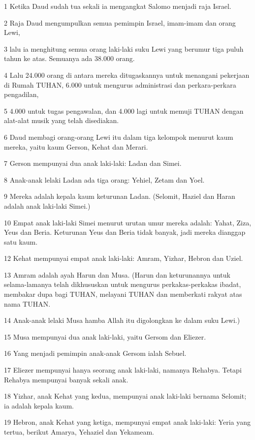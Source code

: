 \par 1 Ketika Daud sudah tua sekali ia mengangkat Salomo menjadi raja Israel.
\par 2 Raja Daud mengumpulkan semua pemimpin Israel, imam-imam dan orang Lewi,
\par 3 lalu ia menghitung semua orang laki-laki suku Lewi yang berumur tiga puluh tahun ke atas. Semuanya ada 38.000 orang.
\par 4 Lalu 24.000 orang di antara mereka ditugaskannya untuk menangani pekerjaan di Rumah TUHAN, 6.000 untuk mengurus administrasi dan perkara-perkara pengadilan,
\par 5 4.000 untuk tugas pengawalan, dan 4.000 lagi untuk memuji TUHAN dengan alat-alat musik yang telah disediakan.
\par 6 Daud membagi orang-orang Lewi itu dalam tiga kelompok menurut kaum mereka, yaitu kaum Gerson, Kehat dan Merari.
\par 7 Gerson mempunyai dua anak laki-laki: Ladan dan Simei.
\par 8 Anak-anak lelaki Ladan ada tiga orang: Yehiel, Zetam dan Yoel.
\par 9 Mereka adalah kepala kaum keturunan Ladan. (Selomit, Haziel dan Haran adalah anak laki-laki Simei.)
\par 10 Empat anak laki-laki Simei menurut urutan umur mereka adalah: Yahat, Ziza, Yeus dan Beria. Keturunan Yeus dan Beria tidak banyak, jadi mereka dianggap satu kaum.
\par 12 Kehat mempunyai empat anak laki-laki: Amram, Yizhar, Hebron dan Uziel.
\par 13 Amram adalah ayah Harun dan Musa. (Harun dan keturunannya untuk selama-lamanya telah dikhususkan untuk mengurus perkakas-perkakas ibadat, membakar dupa bagi TUHAN, melayani TUHAN dan memberkati rakyat atas nama TUHAN.
\par 14 Anak-anak lelaki Musa hamba Allah itu digolongkan ke dalam suku Lewi.)
\par 15 Musa mempunyai dua anak laki-laki, yaitu Gersom dan Eliezer.
\par 16 Yang menjadi pemimpin anak-anak Gersom ialah Sebuel.
\par 17 Eliezer mempunyai hanya seorang anak laki-laki, namanya Rehabya. Tetapi Rehabya mempunyai banyak sekali anak.
\par 18 Yizhar, anak Kehat yang kedua, mempunyai anak laki-laki bernama Selomit; ia adalah kepala kaum.
\par 19 Hebron, anak Kehat yang ketiga, mempunyai empat anak laki-laki: Yeria yang tertua, berikut Amarya, Yehaziel dan Yekameam.
